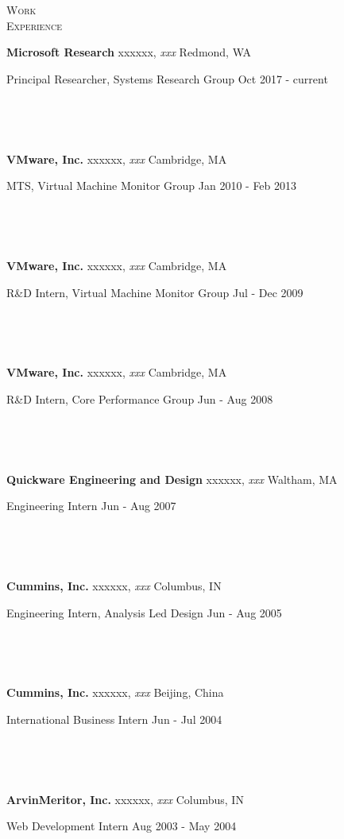 \documentclass[10pt,times]{report}
\newlength{\sectiongap}
\newlength{\entrygap}
\newlength{\sectioncolwidth}
\newlength{\colgap}
\newlength{\stuffwidth}
\def\ifEqString#1#2{\def\testa{#1}\def\testb{#2}%
  \ifx\testa\testb}
\newenvironment{rtable}{
  \begin{minipage}{\textwidth}
  }{
  \end{minipage}
}
\newenvironment{rentry}[3][xxx]{
  \begin{minipage}[t]{\hsize}
    \textbf{#2}\ifEqString{#1}{xxx}\relax\else, \textit{#1}\fi
    \hspace{\stretch{1}} #3 \\
  }{
    \removelastskip
  \end{minipage}
  \\[\entrygap]  %
}
\newcommand{\rline}[2]{
  \begin{minipage}[t]{\hsize}
    #1 \hspace{\stretch{1}} #2
  \end{minipage} \\
}
\newenvironment{rsection}[1]{
  \begin{minipage}[t]{\sectioncolwidth}
    \textsc{#1}
  \end{minipage}
  \hspace{\colgap}
  \begin{minipage}[t]{\stuffwidth}
  }{
    \removelastskip
  \end{minipage}
  \\[\sectiongap]
}
\begin{document}
\begin{rtable}
  \begin{rsection}{Work\\Experience}
    \begin{rentry}{Microsoft Research}{Redmond, WA}
      \rline{Principal Researcher, Systems Research Group} {Oct 2017 - current}
      \vspace{-.5em}
    \end{rentry}
    \begin{rentry}{VMware, Inc.}{Cambridge, MA}      
      \rline{MTS, Virtual Machine Monitor
        Group}{Jan 2010 - Feb 2013}
      \vspace{-.5em}
    \end{rentry}
    \begin{rentry}{VMware, Inc.}{Cambridge, MA}      
      \rline{R\&D Intern, Virtual Machine Monitor Group}{Jul - Dec 2009}
      \vspace{-.5em}
    \end{rentry}
    \begin{rentry}{VMware, Inc.}{Cambridge, MA}      
      \rline{R\&D Intern, Core Performance Group}{Jun - Aug 2008}
      \vspace{-.5em}
    \end{rentry}
    \begin{rentry}{Quickware Engineering and Design}{Waltham, MA}
      \rline{Engineering Intern}{Jun - Aug 2007} 
      \vspace{-.5em}
    \end{rentry}
    \begin{rentry}{Cummins, Inc.}{Columbus, IN}
      \rline{Engineering Intern, Analysis Led Design}{Jun - Aug 2005}
      \vspace{-.5em}
    \end{rentry}
    \begin{rentry}{Cummins, Inc.}{Beijing, China}
      \rline{International Business Intern}{Jun - Jul 2004} 
      \vspace{-.5em}
    \end{rentry}
    \begin{rentry}{ArvinMeritor, Inc.}{Columbus, IN}
      \rline{Web Development Intern}{Aug 2003 - May 2004}
      \vspace{-.5em}
    \end{rentry}
  \end{rsection}

    

\end{rtable}
\end{document}

